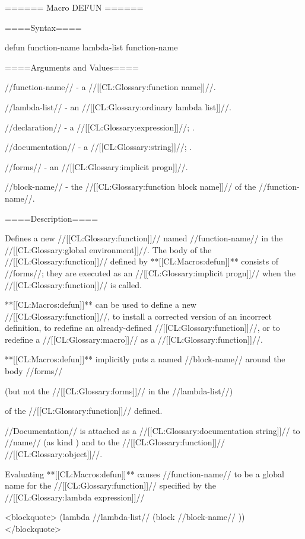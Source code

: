 ====== Macro DEFUN ======

====Syntax====

\DefmacWithValuesNewline defun {function-name lambda-list {\DeclsAndDoc} } {function-name}

====Arguments and Values====

//function-name// - a //[[CL:Glossary:function name]]//.

//lambda-list// - an //[[CL:Glossary:ordinary lambda list]]//.

//declaration// - a  //[[CL:Glossary:expression]]//; \noeval.

//documentation// - a //[[CL:Glossary:string]]//; \noeval.

//forms// - an //[[CL:Glossary:implicit progn]]//.

//block-name// - the //[[CL:Glossary:function block name]]// of the //function-name//.

====Description====

Defines a new //[[CL:Glossary:function]]// named //function-name// in the //[[CL:Glossary:global environment]]//. The body of the //[[CL:Glossary:function]]// defined by **[[CL:Macros:defun]]** consists of //forms//; they are executed as an //[[CL:Glossary:implicit progn]]// when the //[[CL:Glossary:function]]// is called.

**[[CL:Macros:defun]]** can be used to define a new //[[CL:Glossary:function]]//, to install a corrected version of an incorrect definition, to redefine an already-defined //[[CL:Glossary:function]]//, or to redefine a //[[CL:Glossary:macro]]// as a //[[CL:Glossary:function]]//.

**[[CL:Macros:defun]]** implicitly puts a  named //block-name// around the body //forms//

(but not the //[[CL:Glossary:forms]]// in the //lambda-list//)

of the //[[CL:Glossary:function]]// defined.

//Documentation// is attached as a //[[CL:Glossary:documentation string]]// to //name// (as kind ) and to the //[[CL:Glossary:function]]// //[[CL:Glossary:object]]//.

Evaluating **[[CL:Macros:defun]]** causes //function-name// to be a global name for the //[[CL:Glossary:function]]// specified by the //[[CL:Glossary:lambda expression]]//

<blockquote> (lambda //lambda-list// {\DeclsAndDoc} (block //block-name// )) </blockquote>

